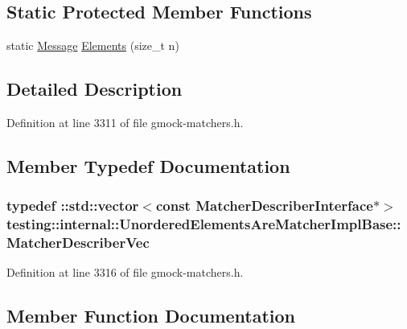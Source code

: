 \subsection*{Static Protected Member Functions}
\begin{DoxyCompactItemize}
\item 
static \hyperlink{classtesting_1_1_message}{Message} \hyperlink{classtesting_1_1internal_1_1_unordered_elements_are_matcher_impl_base_ab6d5a2342e07730b913f419cf662d16a}{Elements} (size\+\_\+t n)
\end{DoxyCompactItemize}


\subsection{Detailed Description}


Definition at line 3311 of file gmock-\/matchers.\+h.



\subsection{Member Typedef Documentation}
\subsubsection[{\texorpdfstring{Matcher\+Describer\+Vec}{MatcherDescriberVec}}]{\setlength{\rightskip}{0pt plus 5cm}typedef \+::std\+::vector$<$const {\bf Matcher\+Describer\+Interface}$\ast$$>$ {\bf testing\+::internal\+::\+Unordered\+Elements\+Are\+Matcher\+Impl\+Base\+::\+Matcher\+Describer\+Vec}\hspace{0.3cm}{\ttfamily [protected]}}\hypertarget{classtesting_1_1internal_1_1_unordered_elements_are_matcher_impl_base_a81ca7ce793d4b25ce2a7d3e28b48cd64}{}\label{classtesting_1_1internal_1_1_unordered_elements_are_matcher_impl_base_a81ca7ce793d4b25ce2a7d3e28b48cd64}


Definition at line 3316 of file gmock-\/matchers.\+h.



\subsection{Member Function Documentation}
